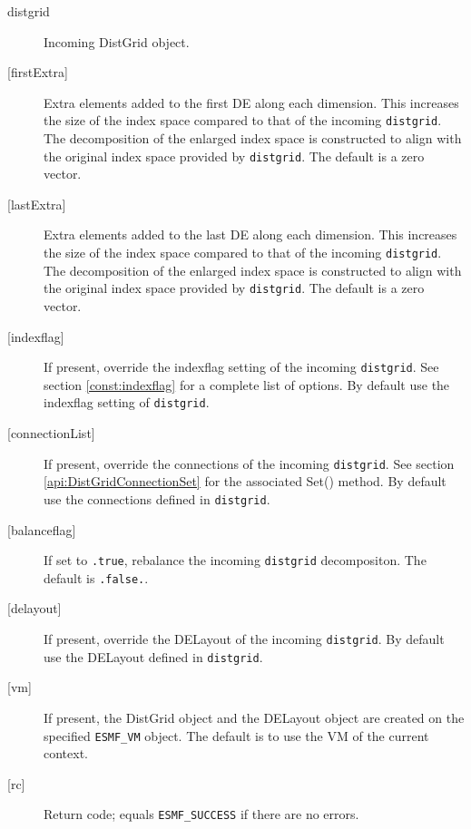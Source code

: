        \begin{description}
       \item[distgrid]
            Incoming DistGrid object.
       \item[{[firstExtra]}]
            Extra elements added to the first DE along each 
            dimension. This increases the size of the index space compared to 
            that of the incoming {\tt distgrid}. The decomposition of the
            enlarged index space is constructed to align with the original index
            space provided by {\tt distgrid}.
            The default is a zero vector.
       \item[{[lastExtra]}]
            Extra elements added to the last DE along each 
            dimension. This increases the size of the index space compared to 
            that of the incoming {\tt distgrid}. The decomposition of the
            enlarged index space is constructed to align with the original index
            space provided by {\tt distgrid}.
            The default is a zero vector.
       \item[{[indexflag]}]
            If present, override the indexflag setting of the incoming
            {\tt distgrid}. See section \ref{const:indexflag} for a 
            complete list of options. By default use the indexflag setting of 
            {\tt distgrid}. 
       \item[{[connectionList]}]
            If present, override the connections of the incoming {\tt distgrid}.
            See section \ref{api:DistGridConnectionSet} for the associated Set()
            method. By default use the connections defined in {\tt distgrid}.
       \item[{[balanceflag]}]
            If set to {\tt .true}, rebalance the incoming {\tt distgrid}
            decompositon. The default is {\tt .false.}.
       \item[{[delayout]}]
            If present, override the DELayout of the incoming {\tt distgrid}.
            By default use the DELayout defined in {\tt distgrid}.
       \item[{[vm]}]
            If present, the DistGrid object and the DELayout object
            are created on the specified {\tt ESMF\_VM} object. The 
            default is to use the VM of the current context. 
       \item[{[rc]}]
            Return code; equals {\tt ESMF\_SUCCESS} if there are no errors.
       \end{description}
   
